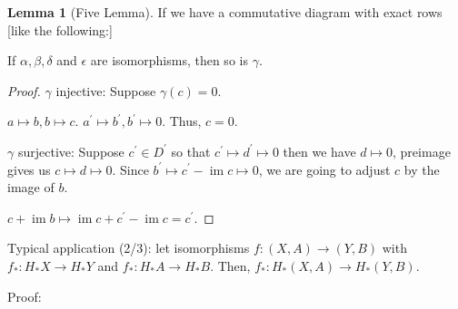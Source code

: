 \documentclass{article}
\theoremstyle{definition}
\newtheorem{lemma}[theorem]{Lemma}
\begin{document}
    \begin{lemma}
        [Five Lemma] If we have a commutative diagram with exact rows [like the following:]

        \begin{center}
        \end{center}

        If \(\alpha , \beta , \delta\) and \(\epsilon\) are isomorphisms, then so is \(\gamma\).

    \end{lemma}

    \begin{proof}
        \(\gamma\) injective: Suppose \(\gamma(c) = 0\). 

        \(a \mapsto b, b \mapsto c\). \(a^{\prime} \mapsto b^{\prime}, b^{\prime} \mapsto 0\). Thus, \(c = 0\).

        \(\gamma\) surjective: Suppose \(c^{\prime} \in D^{\prime}\) so that \(c^{\prime} \mapsto d^{\prime} \mapsto 0\) then we have \(d \mapsto 0\), preimage gives us \(c \mapsto d \mapsto 0\). Since \(b^{\prime} \mapsto c^{\prime} - \operatorname{im} c \mapsto 0\), we are going to adjust \(c\) by the image of \(b\).

        \(c + \operatorname{im} b \mapsto \operatorname{im} c + c^{\prime} - \operatorname{im} c = c^{\prime}\).
    \end{proof}

    Typical application (2/3): let isomorphisms \(f: (X,A) \to (Y,B)\) with \(f_{\ast} : H_{\ast} X \to H_{\ast} Y\) and \(f_{\ast}: H_{\ast} A \to H_{\ast} B\). Then, \(f_{\ast}: H_{\ast} (X,A) \to H_{\ast} (Y,B)\).

    Proof:
    
    \begin{center}
    \end{center}
\end{document}
